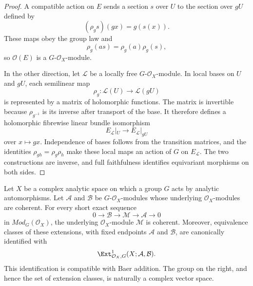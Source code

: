 \begin{proof}
A compatible action on $E$ sends a
section $s$ over $U$ to the section over $gU$ defined by
$$
(\rho_gs)(gx)=g(s(x)).
$$
These maps obey the group law and
$$
\rho_g(as)=\rho_g(a)\rho_g(s),
$$
so $\mathcal O(E)$ is a $G$-$\mathcal O_X$-module.

In the other direction, let $\mathcal L$ be a locally free
$G$-$\mathcal O_X$-module. In local bases on $U$ and $gU$, each semilinear
map
$$
\rho_g:\mathcal L(U)\longrightarrow\mathcal L(gU)
$$
is represented by a matrix of holomorphic functions. The matrix is
invertible because $\rho_{g^{-1}}$ is its inverse after transport of the
base. It therefore defines a holomorphic fibrewise linear bundle
isomorphism
$$
E_{\mathcal L}|_U\longrightarrow E_{\mathcal L}|_{gU}
$$
over $x\mapsto gx$. Independence of bases follows from the transition
matrices, and the identities $\rho_{gh}=\rho_g\rho_h$ make these local maps
an action of $G$ on $E_{\mathcal L}$. The two constructions are inverse,
and full faithfulness identifies equivariant morphisms on both sides.
\end{proof}

\begin{lemma}
\label{lemma-coherent-equivariant-analytic-extension-classes}
\begin{reference}
\cite[Chapter V, \S 5.6, p. 219]{Tohoku}
\end{reference}
Let $X$ be a complex analytic space on which a group $G$ acts by analytic
automorphisms. Let $\mathcal A$ and $\mathcal B$ be $G$-$\mathcal O_X$-modules
whose underlying $\mathcal O_X$-modules are coherent. For every short exact
sequence
$$
0 \longrightarrow \mathcal B \longrightarrow \mathcal M
\longrightarrow \mathcal A \longrightarrow 0
$$
in $\textit{Mod}_G(\mathcal O_X)$, the underlying $\mathcal O_X$-module
$\mathcal M$ is coherent. Moreover, equivalence classes of these extensions,
with fixed endpoints $\mathcal A$ and $\mathcal B$, are canonically identified
with
$$
\Ext^1_{\mathcal O_X,G}(X;\mathcal A,\mathcal B).
$$
This identification is compatible with Baer addition. The group on the right,
and hence the set of extension classes, is naturally a complex vector space.
\end{lemma}


